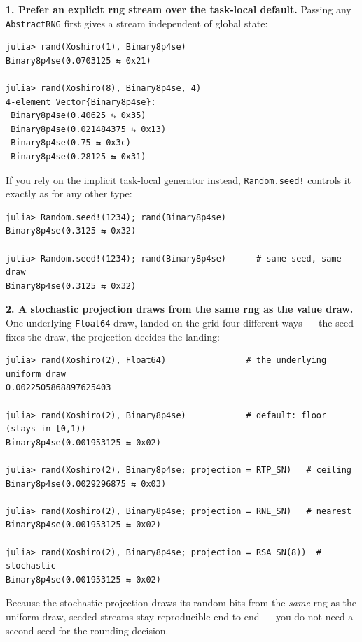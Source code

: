 \textbf{1. Prefer an explicit rng stream over the task-local default.} Passing any \texttt{AbstractRNG} first gives a stream independent of global state:




\nopagebreak[4]
\begin{verbatim}
julia> rand(Xoshiro(1), Binary8p4se)
Binary8p4se(0.0703125 ⇆ 0x21)

julia> rand(Xoshiro(8), Binary8p4se, 4)
4-element Vector{Binary8p4se}:
 Binary8p4se(0.40625 ⇆ 0x35)
 Binary8p4se(0.021484375 ⇆ 0x13)
 Binary8p4se(0.75 ⇆ 0x3c)
 Binary8p4se(0.28125 ⇆ 0x31)
\end{verbatim}



If you rely on the implicit task-local generator instead, \texttt{Random.seed!} controls it exactly as for any other type:




\nopagebreak[4]
\begin{verbatim}
julia> Random.seed!(1234); rand(Binary8p4se)
Binary8p4se(0.3125 ⇆ 0x32)

julia> Random.seed!(1234); rand(Binary8p4se)      # same seed, same draw
Binary8p4se(0.3125 ⇆ 0x32)
\end{verbatim}



\textbf{2. A stochastic projection draws from the same rng as the value draw.} One underlying \texttt{Float64} draw, landed on the grid four different ways — the seed fixes the draw, the projection decides the landing:




\nopagebreak[4]
\begin{verbatim}
julia> rand(Xoshiro(2), Float64)                # the underlying uniform draw
0.0022505868897625403

julia> rand(Xoshiro(2), Binary8p4se)            # default: floor (stays in [0,1))
Binary8p4se(0.001953125 ⇆ 0x02)

julia> rand(Xoshiro(2), Binary8p4se; projection = RTP_SN)   # ceiling
Binary8p4se(0.0029296875 ⇆ 0x03)

julia> rand(Xoshiro(2), Binary8p4se; projection = RNE_SN)   # nearest
Binary8p4se(0.001953125 ⇆ 0x02)

julia> rand(Xoshiro(2), Binary8p4se; projection = RSA_SN(8))  # stochastic
Binary8p4se(0.001953125 ⇆ 0x02)
\end{verbatim}



Because the stochastic projection draws its random bits from the \emph{same} rng as the uniform draw, seeded streams stay reproducible end to end — you do not need a second seed for the rounding decision.



